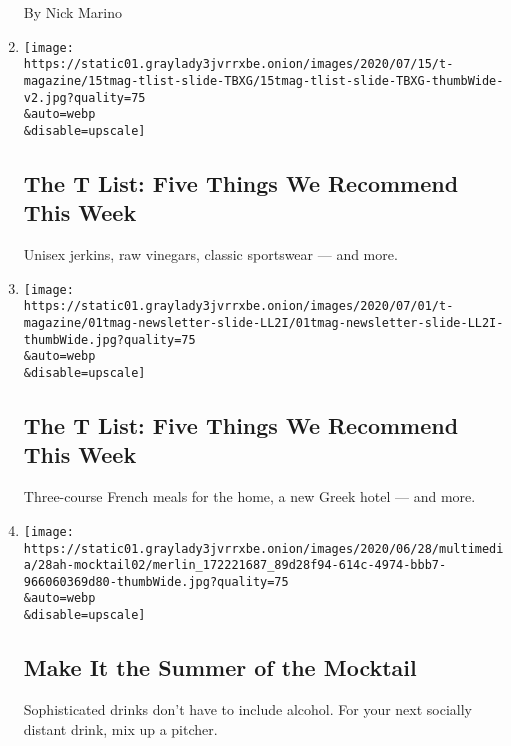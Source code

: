 \begin{enumerate}
  By Nick Marino
\item
  \href{/2020/07/16/t-magazine/margo-price-album-tlist.html}{}

  \texttt{[image: https://static01.graylady3jvrrxbe.onion/images/2020/07/15/t-magazine/15tmag-tlist-slide-TBXG/15tmag-tlist-slide-TBXG-thumbWide-v2.jpg?quality=75\\\&auto=webp\\\&disable=upscale]}

  \hypertarget{the-t-list-five-things-we-recommend-this-week-1}{%
  \subsection{The T List: Five Things We Recommend This
  Week}\label{the-t-list-five-things-we-recommend-this-week-1}}

  Unisex jerkins, raw vinegars, classic sportswear --- and more.
\item
  \href{/2020/07/02/t-magazine/kenzo-vans-tlist.html}{}

  \texttt{[image: https://static01.graylady3jvrrxbe.onion/images/2020/07/01/t-magazine/01tmag-newsletter-slide-LL2I/01tmag-newsletter-slide-LL2I-thumbWide.jpg?quality=75\\\&auto=webp\\\&disable=upscale]}

  \hypertarget{the-t-list-five-things-we-recommend-this-week-2}{%
  \subsection{The T List: Five Things We Recommend This
  Week}\label{the-t-list-five-things-we-recommend-this-week-2}}

  Three-course French meals for the home, a new Greek hotel --- and
  more.
\item
  \href{/2020/06/27/at-home/coronavirus-make-mocktails.html}{}

  \texttt{[image: https://static01.graylady3jvrrxbe.onion/images/2020/06/28/multimedia/28ah-mocktail02/merlin\_172221687\_89d28f94-614c-4974-bbb7-966060369d80-thumbWide.jpg?quality=75\\\&auto=webp\\\&disable=upscale]}

  \hypertarget{make-it-the-summer-of-the-mocktail}{%
  \subsection{Make It the Summer of the
  Mocktail}\label{make-it-the-summer-of-the-mocktail}}

  Sophisticated drinks don't have to include alcohol. For your next
  socially distant drink, mix up a pitcher.


\end{enumerate}

